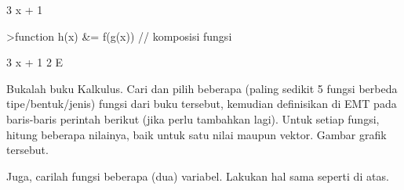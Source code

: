 \documentclass{article}
\begin{document}
\begin{eulernotebook}
\begin{eulercomment}
\begin{eulercomment}
\begin{euleroutput}
                                 3 x + 1
  
\end{euleroutput}
\begin{eulerprompt}
>function h(x) &= f(g(x)) // komposisi fungsi
\end{eulerprompt}
\begin{euleroutput}
  
                                   3 x + 1
                                2 E
  
\end{euleroutput}
\begin{eulercomment}
Bukalah buku Kalkulus. Cari dan pilih beberapa (paling sedikit 5
fungsi berbeda tipe/bentuk/jenis) fungsi dari buku tersebut, kemudian
definisikan di EMT pada baris-baris perintah berikut (jika perlu
tambahkan lagi). Untuk setiap fungsi, hitung beberapa nilainya, baik
untuk satu nilai maupun vektor. Gambar grafik tersebut.

Juga, carilah fungsi beberapa (dua) variabel. Lakukan hal sama seperti
di atas.


\end{eulercomment}
\end{eulercomment}
\end{eulercomment}
\end{eulernotebook}
\end{document}
